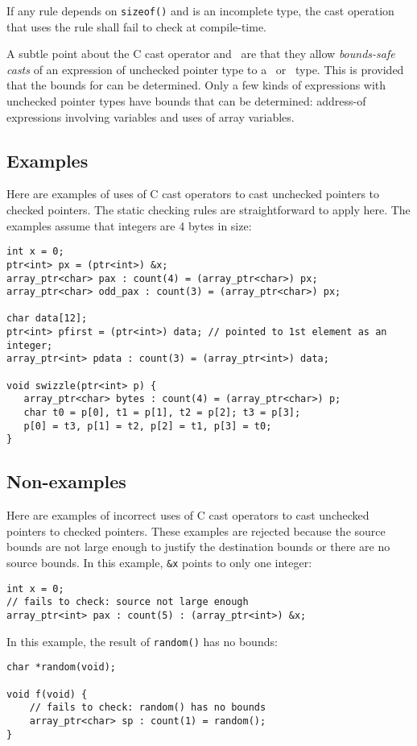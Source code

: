 If any rule depends on \texttt{sizeof()} and  is
an incomplete type, the cast operation that uses the rule shall fail
to check at compile-time.

A subtle point about the C cast operator and \dynamicboundscast\
are that they allow {\em bounds-safe casts} of an expression
 of unchecked pointer type to a \spanptr\ or
\arrayptr\ type. This is provided that the bounds for 
can be determined. Only a few kinds of expressions with unchecked pointer
types have bounds that can be determined: address-of expressions
involving variables and uses of array variables.

\subsection{Examples}
\label{section:pointer-cast-examples}

Here are examples of uses of C cast operators to cast unchecked
pointers to checked pointers.  The static checking rules are straightforward
to apply here.  The examples assume that integers are
4 bytes in size:
\begin{verbatim}
int x = 0;
ptr<int> px = (ptr<int>) &x;
array_ptr<char> pax : count(4) = (array_ptr<char>) px;
array_ptr<char> odd_pax : count(3) = (array_ptr<char>) px;

char data[12];
ptr<int> pfirst = (ptr<int>) data; // pointed to 1st element as an integer;
array_ptr<int> pdata : count(3) = (array_ptr<int>) data;

void swizzle(ptr<int> p) {
   array_ptr<char> bytes : count(4) = (array_ptr<char>) p;
   char t0 = p[0], t1 = p[1], t2 = p[2]; t3 = p[3];
   p[0] = t3, p[1] = t2, p[2] = t1, p[3] = t0;
}
\end{verbatim}

\subsection{Non-examples}

Here are examples of incorrect uses of C cast operators to cast unchecked
pointers to checked pointers.  These examples are rejected because the
source bounds are not large enough to justify the destination bounds or
there are no source bounds.
In this example, \verb|&x| points to only one integer:
\begin{verbatim}
int x = 0;
// fails to check: source not large enough
array_ptr<int> pax : count(5) : (array_ptr<int>) &x;
\end{verbatim}
In this example, the result of \texttt{random()} has no bounds:
\begin{verbatim}
char *random(void);

void f(void) {
    // fails to check: random() has no bounds
    array_ptr<char> sp : count(1) = random();
}
\end{verbatim}

